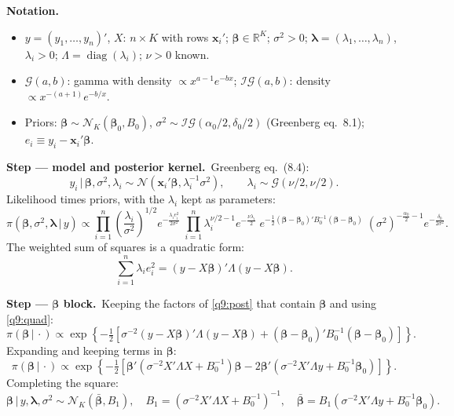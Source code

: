 \documentclass[11pt,a4paper]{article}
\numberwithin{equation}{questao}
\newenvironment{notacao}{\par\smallskip\noindent\textbf{Notation.}\begin{itemize}[leftmargin=1.4em,topsep=1pt,itemsep=0pt]\small}{\end{itemize}}
\newcommand{\passo}[2]{\par\smallskip\noindent\textbf{Step --- #1.}~#2}
\newcommand{\N}{\mathcal{N}}
\newcommand{\IG}{\mathcal{IG}}
\newcommand{\Ga}{\mathcal{G}}
\begin{document}
\begin{sol}
\begin{notacao}
\item $y=(y_1,\dots,y_n)'$, $X$: $n\times K$ with rows $\mathbf{x}_i'$; $\boldsymbol\beta\in\mathbb{R}^K$; $\sigma^2>0$; $\boldsymbol\lambda=(\lambda_1,\dots,\lambda_n)$, $\lambda_i>0$; $\Lambda=\operatorname{diag}(\lambda_i)$; $\nu>0$ known.
\item $\Ga(a,b)$: gamma with density $\propto x^{a-1}e^{-bx}$; $\IG(a,b)$: density $\propto x^{-(a+1)}e^{-b/x}$.
\item Priors: $\boldsymbol\beta\sim\N_K(\boldsymbol\beta_0,B_0)$, $\sigma^2\sim\IG(\alpha_0/2,\delta_0/2)$ (Greenberg eq.~8.1); $e_i\equiv y_i-\mathbf{x}_i'\boldsymbol\beta$.
\end{notacao}

\passo{model and posterior kernel}{Greenberg eq.~(8.4):
\begin{equation}
y_i\,|\,\boldsymbol\beta,\sigma^2,\lambda_i\sim\N(\mathbf{x}_i'\boldsymbol\beta,\lambda_i^{-1}\sigma^2),\qquad\lambda_i\sim\Ga(\nu/2,\nu/2). \label{q9:model}
\end{equation}
Likelihood times priors, with the $\lambda_i$ kept as parameters:
\begin{equation}
\pi(\boldsymbol\beta,\sigma^2,\boldsymbol\lambda\,|\,y)\propto\prod_{i=1}^n\left(\frac{\lambda_i}{\sigma^2}\right)^{1/2}\!e^{-\frac{\lambda_ie_i^2}{2\sigma^2}}\;\prod_{i=1}^n\lambda_i^{\nu/2-1}e^{-\frac{\nu\lambda_i}{2}}\;e^{-\frac12(\boldsymbol\beta-\boldsymbol\beta_0)'B_0^{-1}(\boldsymbol\beta-\boldsymbol\beta_0)}\;(\sigma^2)^{-\frac{\alpha_0}{2}-1}e^{-\frac{\delta_0}{2\sigma^2}}. \label{q9:post}
\end{equation}
The weighted sum of squares is a quadratic form:
\begin{equation}
\sum_{i=1}^n\lambda_ie_i^2=(y-X\boldsymbol\beta)'\Lambda(y-X\boldsymbol\beta). \label{q9:quad}
\end{equation}}

\passo{$\boldsymbol\beta$ block}{Keeping the factors of \eqref{q9:post} that contain $\boldsymbol\beta$ and using \eqref{q9:quad}:
\begin{equation*}
\pi(\boldsymbol\beta\,|\,\cdot)\propto\exp\left\{-\tfrac12\left[\sigma^{-2}(y-X\boldsymbol\beta)'\Lambda(y-X\boldsymbol\beta)+(\boldsymbol\beta-\boldsymbol\beta_0)'B_0^{-1}(\boldsymbol\beta-\boldsymbol\beta_0)\right]\right\}.
\end{equation*}
Expanding and keeping terms in $\boldsymbol\beta$:
\begin{equation*}
\pi(\boldsymbol\beta\,|\,\cdot)\propto\exp\left\{-\tfrac12\left[\boldsymbol\beta'(\sigma^{-2}X'\Lambda X+B_0^{-1})\boldsymbol\beta-2\boldsymbol\beta'(\sigma^{-2}X'\Lambda y+B_0^{-1}\boldsymbol\beta_0)\right]\right\}.
\end{equation*}
Completing the square:
\begin{equation}
\boldsymbol\beta\,|\,y,\boldsymbol\lambda,\sigma^2\sim\N_K(\bar{\boldsymbol\beta},B_1),\quad B_1=(\sigma^{-2}X'\Lambda X+B_0^{-1})^{-1},\quad\bar{\boldsymbol\beta}=B_1(\sigma^{-2}X'\Lambda y+B_0^{-1}\boldsymbol\beta_0). \label{q9:beta}
\end{equation}}


\end{sol}
\end{document}
